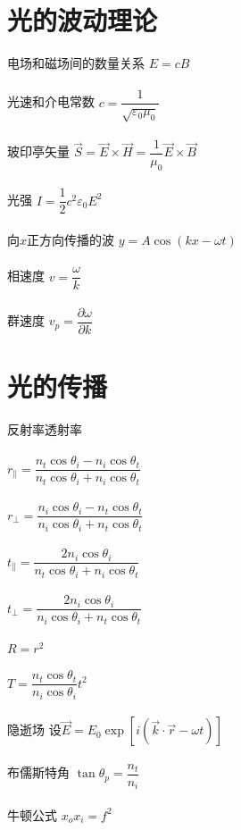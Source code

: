 \documentclass{article}
\begin{document}
\begin{multicols}{2}

\section{光的波动理论}

电场和磁场间的数量关系 $E = c B$
\\\\
光速和介电常数 $c = \dfrac{1}{\sqrt{\varepsilon_0 \mu_0}} $
\\\\
玻印亭矢量 $\vec{S} = \vec{E} \times \vec{H} = \dfrac{1}{\mu_0} \vec{E} \times \vec{B} $
\\\\
光强 $I = \dfrac{1}{2} c^2 \varepsilon_0 E^2 $
\\\\
向$x$正方向传播的波 $y = A \cos \left( k x - \omega t \right)$
\\\\
相速度 $v = \dfrac{\omega}{k} $
\\\\
群速度 $v_p = \dfrac{\partial \omega}{\partial k} $

\section{光的传播}

反射率透射率
\\\\
$r_{\parallel} = \dfrac{n_t \cos \theta_i - n_i \cos \theta_t}{n_t \cos \theta_i + n_i \cos \theta_t} $
\\\\
$r_{\perp} = \dfrac{n_i \cos \theta_i - n_t \cos \theta_t}{n_i \cos \theta_i + n_t \cos \theta_t} $
\\\\
$t_{\parallel} = \dfrac{2 n_i \cos \theta_i}{n_t \cos \theta_i + n_i \cos \theta_t} $
\\\\
$t_{\perp} = \dfrac{2 n_i \cos \theta_i }{n_i \cos \theta_i + n_t \cos \theta_t} $
\\\\
$R = r^2$
\\\\
$T = \dfrac{n_t \cos \theta_t}{n_i \cos \theta_i} t^2 $
\\\\
隐逝场 设$\vec{E} = E_0 \exp \left[ i \left( \vec{k} \cdot \vec{r} - \omega t \right) \right]$
\\\\
布儒斯特角 $\tan \theta_p = \dfrac{n_t}{n_i} $
\\\\
牛顿公式 $x_o x_i = f^2$


\end{multicols}
\end{document}
